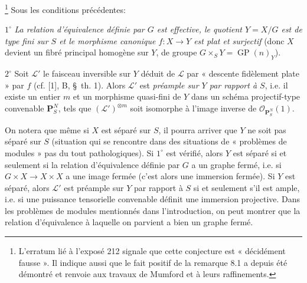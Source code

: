 \footnote{L'erratum lié à l'exposé 212 signale que
cette conjecture est « décidément fausse ». Il indique aussi que le fait
positif de la remarque 8.1 a depuis été démontré et renvoie aux travaux de
Mumford et à leurs raffinements.} Sous les conditions précédentes:

\smallskip
\noindent $1^\circ$ \emph{La relation d'équivalence définie par $G$ est
effective, le quotient $Y=X/G$ est de type fini sur $S$ et le morphisme
canonique $f:X\to Y$ est plat et surjectif} (donc $X$ devient un fibré
principal homogène sur $Y$, de groupe $G\times_S Y=\operatorname{GP}(n)_Y$).

\smallskip
\noindent $2^\circ$ Soit $\mathcal L'$ le faisceau inversible sur $Y$ déduit
de $\mathcal L$ par « descente fidèlement plate » par $f$ (cf. [1], B,
\S~th. 1). Alors $\mathcal L'$ est \emph{préample sur $Y$ par rapport à $S$},
i.e. il existe un entier $m$ et un morphisme quasi-fini de $Y$ dans un schéma
projectif-type convenable $\mathbf P_S^N$, tels que $(\mathcal L')^{\otimes m}$
soit isomorphe à l'image inverse de $\mathcal O_{\mathbf P_S^N}(1)$.

On notera que même si $X$ est séparé sur $S$, il pourra arriver que $Y$ ne soit
pas séparé sur $S$ (situation qui se rencontre dans des situations de
« problèmes de modules » pas du tout pathologiques). Si $1^\circ$ est vérifié,
alors $Y$ est séparé si et seulement si la relation d'équivalence définie par
$G$ a un graphe fermé, i.e. si $G\times X\to X\times X$ a une image fermée
(c'est alors une immersion fermée). Si $Y$ est séparé, alors $\mathcal L'$ est
préample sur $Y$ par rapport à $S$ si et seulement s'il est ample, i.e. si
une puissance tensorielle convenable définit une immersion projective. Dans
les problèmes de modules mentionnés dans l'introduction, on peut montrer que la
relation d'équivalence à laquelle on parvient a bien un graphe fermé.

